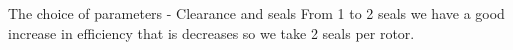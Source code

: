 \documentclass{beamer}
\begin{document}
\begin{frame}[t]{The choice of parameters - Clearance and seals}
From 1 to 2 seals we have a good increase in efficiency that is decreases so we take 2 seals per rotor.

\vspace{-0.5cm}
\begin{figure}%
    \centering
\end{figure}
\end{frame}
\end{document}
